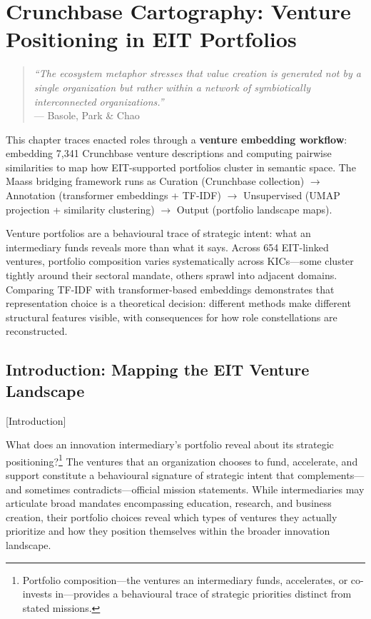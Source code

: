 \documentclass[../main.tex]{subfiles}
\begin{document}
\chapter{Crunchbase Cartography: Venture Positioning in EIT Portfolios}
\margintoc

\begin{quote}
\textit{``The ecosystem metaphor stresses that value creation is generated not by a single organization but rather within a network of symbiotically interconnected organizations.''}\\
--- Basole, Park \& Chao \cite{basole2019visual}
\end{quote}

\begin{chapteroverview}
This chapter traces enacted roles through a \textbf{venture embedding workflow}: embedding 7,341 Crunchbase venture descriptions and computing pairwise similarities to map how EIT-supported portfolios cluster in semantic space. The Maass bridging framework runs as Curation (Crunchbase collection) $\rightarrow$ Annotation (transformer embeddings + TF-IDF) $\rightarrow$ Unsupervised (UMAP projection + similarity clustering) $\rightarrow$ Output (portfolio landscape maps).

Venture portfolios are a behavioural trace of strategic intent: what an intermediary funds reveals more than what it says. Across 654 EIT-linked ventures, portfolio composition varies systematically across KICs---some cluster tightly around their sectoral mandate, others sprawl into adjacent domains. Comparing TF-IDF with transformer-based embeddings demonstrates that representation choice is a theoretical decision: different methods make different structural features visible, with consequences for how role constellations are reconstructed.
\end{chapteroverview}

\section{Introduction: Mapping the EIT Venture Landscape}[Introduction]

What does an innovation intermediary's portfolio reveal about its strategic positioning?\footnote{Portfolio composition---the ventures an intermediary funds, accelerates, or co-invests in---provides a behavioural trace of strategic priorities distinct from stated missions.} The ventures that an organization chooses to fund, accelerate, and support constitute a behavioural signature of strategic intent that complements---and sometimes contradicts---official mission statements. While intermediaries may articulate broad mandates encompassing education, research, and business creation, their portfolio choices reveal which types of ventures they actually prioritize and how they position themselves within the broader innovation landscape.
\end{document}
